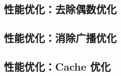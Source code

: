 \documentclass{article}
\begin{document}
  \subsection{性能优化：去除偶数优化}

  \subsection{性能优化：消除广播优化}

  \subsection{性能优化：Cache 优化}
\end{document}

